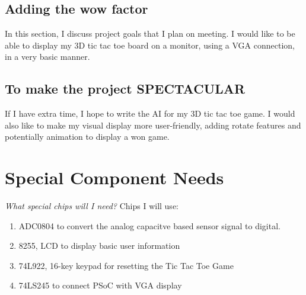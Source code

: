 \documentclass[12pt,twoside]{article}
\begin{document}
\subsection{Adding the wow factor}
In this section, I discuss project goals that I plan on meeting. I would like to be able to display my 3D tic tac toe board on a monitor, using a VGA connection, in a very basic manner. 

\subsection{To make the project SPECTACULAR}
If I have extra time, I hope to write the AI for my 3D tic tac toe game. I would also like to make my visual display more user-friendly, adding rotate features and potentially animation to display a won game. 


\section{Special Component Needs}
\emph{What special chips will I need?} 
Chips I will use: 
\begin{enumerate}
\item ADC0804 to convert the analog capacitve based sensor signal to digital.
\item 8255, LCD to display basic user information
\item 74L922, 16-key keypad for resetting the Tic Tac Toe Game
\item 74LS245 to connect PSoC with VGA display
\end{enumerate}
\end{document}
